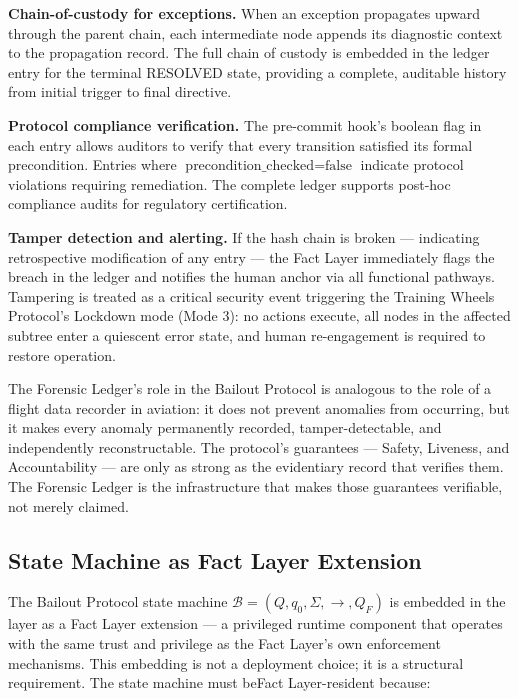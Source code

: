 \bigskip
\noindent\textbf{Chain-of-custody for exceptions.} When an exception propagates upward through the parent chain, each intermediate node appends its diagnostic context to the propagation record. The full chain of custody is embedded in the ledger entry for the terminal RESOLVED state, providing a complete, auditable history from initial trigger to final directive.

\bigskip
\noindent\textbf{Protocol compliance verification.} The pre-commit hook's boolean flag in each entry allows auditors to verify that every transition satisfied its formal precondition. Entries where $\text{precondition\_checked} = \text{false}$ indicate protocol violations requiring remediation. The complete ledger supports post-hoc compliance audits for regulatory certification.

\bigskip
\noindent\textbf{Tamper detection and alerting.} If the hash chain is broken — indicating retrospective modification of any entry — the Fact Layer immediately flags the breach in the ledger and notifies the human anchor via all functional pathways. Tampering is treated as a critical security event triggering the Training Wheels Protocol's Lockdown mode (Mode 3): no actions execute, all nodes in the affected subtree enter a quiescent error state, and human re-engagement is required to restore operation.

The Forensic Ledger's role in the Bailout Protocol is analogous to the role of a flight data recorder in aviation: it does not prevent anomalies from occurring, but it makes every anomaly permanently recorded, tamper-detectable, and independently reconstructable. The protocol's guarantees — Safety, Liveness, and Accountability — are only as strong as the evidentiary record that verifies them. The Forensic Ledger is the infrastructure that makes those guarantees verifiable, not merely claimed.

\subsection{State Machine as Fact Layer Extension}
\label{sec:impl:sm-as-fact-extension}

The Bailout Protocol state machine $\mathcal{B} = (Q, q_0, \Sigma, \rightarrow, Q_F)$ is embedded in the \fact{} layer as a Fact Layer extension — a privileged runtime component that operates with the same trust and privilege as the Fact Layer's own enforcement mechanisms. This embedding is not a deployment choice; it is a structural requirement. The state machine must beFact Layer-resident because:

